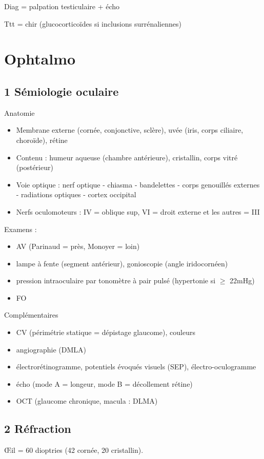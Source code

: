\documentclass[11pt]{article}
\begin{document}
Diag = palpation testiculaire + écho

Ttt = chir (glucocorticoïdes si inclusions surrénaliennes)

\section{Ophtalmo}
\label{sec:org4c0f288}
\subsection{1 Sémiologie oculaire}
\label{sec:orgfb47abe}
Anatomie 
\begin{itemize}
\item Membrane externe (cornée, conjonctive, sclère), uvée (iris, corps ciliaire,
choroïde), rétine
\item Contenu : humeur aqueuse (chambre antérieure), cristallin, corps vitré
(postérieur)
\item Voie optique : nerf optique - chiasma - bandelettes - corps genouillés
externes - radiations optiques - cortex occipital
\item Nerfs oculomoteurs : IV = oblique sup, VI = droit externe et les autres = III
\end{itemize}
Examens :
\begin{itemize}
\item AV (Parinaud = près, Monoyer = loin)
\item lampe à fente (segment antérieur), gonioscopie (angle iridocornéen)
\item pression intraoculaire par tonomètre à pair pulsé (hypertonie si \(\ge\) 22mHg)
\item FO
\end{itemize}
Complémentaires
\begin{itemize}
\item CV (périmétrie statique = dépistage glaucome), couleurs
\item angiographie (DMLA)
\item électrorétinogramme, potentiels évoqués visuels (SEP), électro-oculogramme
\item écho (mode A = longeur, mode B = décollement rétine)
\item OCT (glaucome chronique, macula : DLMA)
\end{itemize}
\subsection{2 Réfraction}
\label{sec:org517a374}
\OE{}il = 60 dioptries (42 cornée, 20 cristallin).
\end{document}
